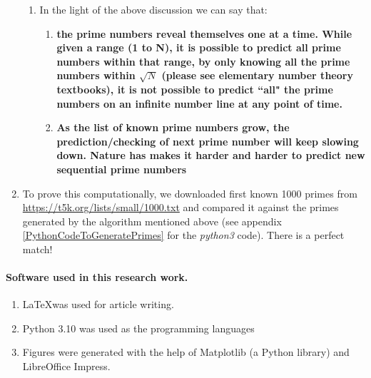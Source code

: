 \documentclass[10pt, twoside]{article}
\begin{document}
\begin{enumerate}
\begin{enumerate}
	\item In the light of the above discussion we can say that: 
	\begin{enumerate}
	\item \textbf{the prime numbers reveal themselves one at a time. While given a range (1 to N), it is possible to predict all prime numbers within that range, by only knowing all the prime numbers within $\sqrt{N}$ (please see elementary number theory textbooks), it is not possible to predict ``all" the prime numbers on an infinite number line at any point of time.}
	\item \textbf{As the list of known prime numbers grow, the prediction/checking of next prime number will keep slowing down. Nature has makes it harder and harder to predict new sequential prime numbers} 
	\end{enumerate}

	\end{enumerate}
	\item To prove this computationally, we downloaded first known 1000 primes from \url{https://t5k.org/lists/small/1000.txt}  and compared it against the primes generated by the algorithm mentioned above (see appendix \ref{PythonCodeToGeneratePrimes} for the \textit{python3} code). There is a perfect match!\label{PrimeNumberGeneration}
	
\end{enumerate}
 
\paragraph{Software used in this research work.}
\begin{enumerate}
\item \LaTeX was used for article writing.
\item Python 3.10 was used as the programming languages
\item Figures were generated with the help of Matplotlib (a Python library) and LibreOffice Impress.
\end{enumerate}
\end{document}

